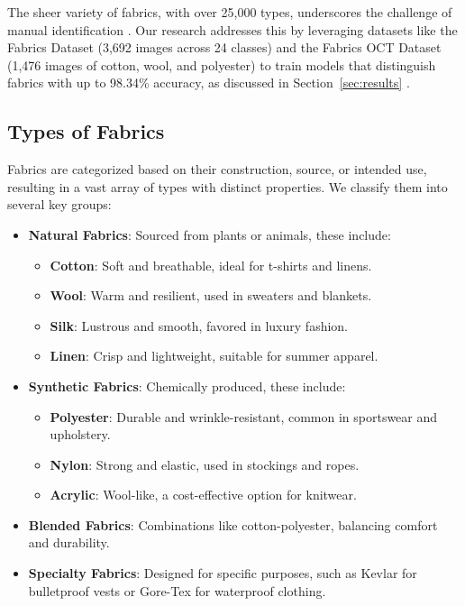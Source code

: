 The sheer variety of fabrics, with over 25,000 types, underscores the challenge of manual identification \citep{Kampouris2016}. Our research addresses this by leveraging datasets like the Fabrics Dataset (3,692 images across 24 classes) and the Fabrics OCT Dataset (1,476 images of cotton, wool, and polyester) to train models that distinguish fabrics with up to 98.34\% accuracy, as discussed in Section~\ref{sec:results} \citep{Jatav2025}.

\subsection{Types of Fabrics}
\label{subsec:fabric_types}

Fabrics are categorized based on their construction, source, or intended use, resulting in a vast array of types with distinct properties. We classify them into several key groups:
\begin{itemize}
    \item \textbf{Natural Fabrics}: Sourced from plants or animals, these include:
        \begin{itemize}
            \item \textbf{Cotton}: Soft and breathable, ideal for t-shirts and linens.
            \item \textbf{Wool}: Warm and resilient, used in sweaters and blankets.
            \item \textbf{Silk}: Lustrous and smooth, favored in luxury fashion.
            \item \textbf{Linen}: Crisp and lightweight, suitable for summer apparel.
        \end{itemize}
    \item \textbf{Synthetic Fabrics}: Chemically produced, these include:
        \begin{itemize}
            \item \textbf{Polyester}: Durable and wrinkle-resistant, common in sportswear and upholstery.
            \item \textbf{Nylon}: Strong and elastic, used in stockings and ropes.
            \item \textbf{Acrylic}: Wool-like, a cost-effective option for knitwear.
        \end{itemize}
    \item \textbf{Blended Fabrics}: Combinations like cotton-polyester, balancing comfort and durability.
    \item \textbf{Specialty Fabrics}: Designed for specific purposes, such as Kevlar for bulletproof vests or Gore-Tex for waterproof clothing.
\end{itemize}


